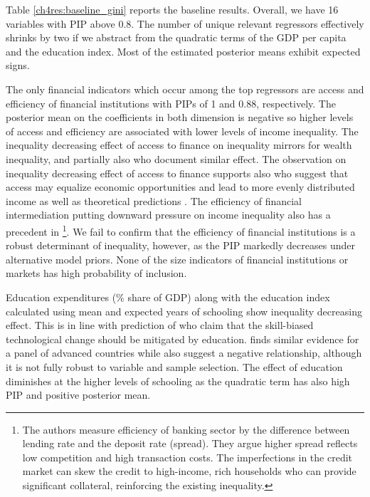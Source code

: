 \begin{refsection}

Table \ref{ch4res:baseline_gini} reports the baseline results. Overall, we have 16 variables with \ac{PIP} above 0.8. The number of unique relevant regressors effectively shrinks by two if we abstract from the quadratic terms of the \ac{GDP} per capita and the education index. Most of the estimated posterior means exhibit expected signs.

The only financial indicators which occur among the top regressors are access and efficiency of financial institutions with \acp{PIP} of 1 and 0.88, respectively. The posterior mean on the coefficients in both dimension is negative so higher levels of access and efficiency are associated with lower levels of income inequality. The inequality decreasing effect of access to finance on inequality mirrors \textcite{hasan2020finance} for wealth inequality, and partially also \textcite{furceri2019robust, naceurzhang2016} who document similar effect. The observation on inequality decreasing effect of access to finance supports also \textcite{claessens2007finance} who suggest that access may equalize economic opportunities and lead to more evenly distributed income as well as theoretical predictions \parencite{braunetal2019,galormoav2004,banerjeenewman1990}. The efficiency of financial intermediation putting downward pressure on income inequality also has a precedent in \textcite{gimet2011closer}\footnote{The authors measure efficiency of banking sector by the difference between lending rate and the deposit rate (spread). They argue higher spread reflects low competition and high transaction costs. The imperfections in the credit market can skew the credit to high-income, rich households who can provide significant collateral, reinforcing the existing inequality.}. We fail to confirm that the efficiency of financial institutions is a robust determinant of inequality, however, as the \ac{PIP} markedly decreases under alternative model priors. None of the size indicators of financial institutions or markets has high probability of inclusion.

Education expenditures (\% share of \ac{GDP}) along with the education index calculated using mean and expected years of schooling show inequality decreasing effect. This is in line with prediction of \textcite{goldin2009race,deaton2013great} who claim that the skill-biased technological change should be mitigated by education. \textcite{oecd2011divided} finds similar evidence for a panel of advanced countries while \textcite{furceri2019robust} also suggest a negative relationship, although it is not fully robust to variable and sample selection. The effect of education diminishes at the higher levels of schooling as the quadratic term has also high \ac{PIP} and positive posterior mean. 


\end{refsection}
